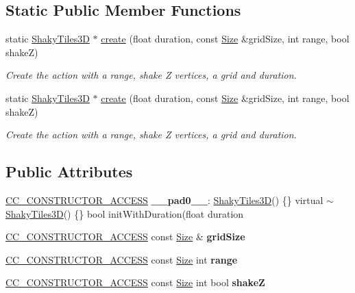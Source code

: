 \subsection*{Static Public Member Functions}
\begin{DoxyCompactItemize}
\item 
static \hyperlink{classShakyTiles3D}{Shaky\+Tiles3D} $\ast$ \hyperlink{classShakyTiles3D_a5c2c177b5795f1d9137734c6849bead8}{create} (float duration, const \hyperlink{classSize}{Size} \&grid\+Size, int range, bool shakeZ)
\begin{DoxyCompactList}\small\item\em Create the action with a range, shake Z vertices, a grid and duration. \end{DoxyCompactList}\item 
static \hyperlink{classShakyTiles3D}{Shaky\+Tiles3D} $\ast$ \hyperlink{classShakyTiles3D_a8665858c64b1fa9784895bd2b98cdd44}{create} (float duration, const \hyperlink{classSize}{Size} \&grid\+Size, int range, bool shakeZ)
\begin{DoxyCompactList}\small\item\em Create the action with a range, shake Z vertices, a grid and duration. \end{DoxyCompactList}\end{DoxyCompactItemize}
\subsection*{Public Attributes}
\begin{DoxyCompactItemize}
\item 
\mbox{\label{classShakyTiles3D_a1f921fb67160b31cd806e16f1471ad2f}} 
\hyperlink{_2cocos2d_2cocos_2base_2ccConfig_8h_a25ef1314f97c35a2ed3d029b0ead6da0}{C\+C\+\_\+\+C\+O\+N\+S\+T\+R\+U\+C\+T\+O\+R\+\_\+\+A\+C\+C\+E\+SS} {\bfseries \+\_\+\+\_\+pad0\+\_\+\+\_\+}\+: \hyperlink{classShakyTiles3D}{Shaky\+Tiles3D}() \{\} virtual $\sim$\hyperlink{classShakyTiles3D}{Shaky\+Tiles3D}() \{\} bool init\+With\+Duration(float duration
\item 
\mbox{\label{classShakyTiles3D_ace0cfbaff7467d1995a3b7ad703d6b78}} 
\hyperlink{_2cocos2d_2cocos_2base_2ccConfig_8h_a25ef1314f97c35a2ed3d029b0ead6da0}{C\+C\+\_\+\+C\+O\+N\+S\+T\+R\+U\+C\+T\+O\+R\+\_\+\+A\+C\+C\+E\+SS} const \hyperlink{classSize}{Size} \& {\bfseries grid\+Size}
\item 
\mbox{\label{classShakyTiles3D_a653d11273ad26d92ff5237508497cc11}} 
\hyperlink{_2cocos2d_2cocos_2base_2ccConfig_8h_a25ef1314f97c35a2ed3d029b0ead6da0}{C\+C\+\_\+\+C\+O\+N\+S\+T\+R\+U\+C\+T\+O\+R\+\_\+\+A\+C\+C\+E\+SS} const \hyperlink{classSize}{Size} int {\bfseries range}
\item 
\mbox{\label{classShakyTiles3D_a1d81d8cf56117c88e7000556ba2c482e}} 
\hyperlink{_2cocos2d_2cocos_2base_2ccConfig_8h_a25ef1314f97c35a2ed3d029b0ead6da0}{C\+C\+\_\+\+C\+O\+N\+S\+T\+R\+U\+C\+T\+O\+R\+\_\+\+A\+C\+C\+E\+SS} const \hyperlink{classSize}{Size} int bool {\bfseries shakeZ}
\end{DoxyCompactItemize}
